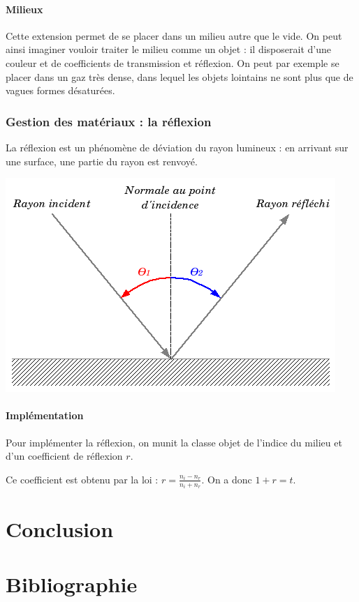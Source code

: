 \documentclass{article}
\begin{document}
\paragraph{Milieux}
Cette extension permet de se placer dans un milieu autre que le vide. On peut
ainsi imaginer vouloir traiter le milieu comme un objet : il disposerait d'une
couleur et de coefficients de transmission et réflexion. On peut par exemple se
placer dans un gaz très dense, dans lequel les objets lointains ne sont plus que
de vagues formes désaturées.

\subsubsection{Gestion des matériaux : la réflexion}
La réflexion est un phénomène de déviation du rayon lumineux : en arrivant
sur une surface, une partie du rayon est renvoyé.

\begin{center}
  \includegraphics[scale=0.5]{img/reflexion.png}
\end{center}

\paragraph{Implémentation}
Pour implémenter la réflexion, on munit la classe objet de l'indice du milieu et
d'un coefficient de réflexion $r$.

Ce coefficient est obtenu par la loi : $r= \frac{n_i - n_r}{n_i + n_r}$. On a
donc $1+r=t$.

\section{Conclusion}

\appendix
\section{Bibliographie}
\end{document}
